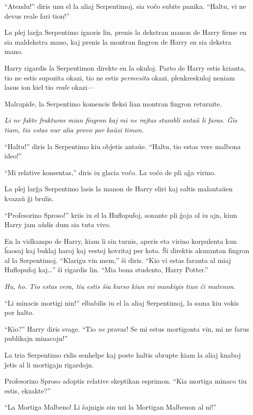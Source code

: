 ``Atendu!'' diris unu el la aliaj Serpentimoj, sia voĉo subite
panika. ``Haltu, vi ne devus reale fari tion!''

La plej larĝa Serpentimo ignoris lin, prenis la dekstran manon de Harry
firme en sia maldekstra mano, kaj prenis la montran fingron de Harry
en sia dekstra mano.

Harry rigardis la Serpentimon direkte en la okuloj. Parto de Harry
estis krianta, tio ne estis supozita okazi, tio ne estis \emph{permesita}
okazi, plenkreskuloj neniam lasus ion kiel tio \emph{reale} okazi—

Malrapide, la Serpentimo komencis fleksi lian montran fingron returnite.

\emph{Li ne fakte frakturos mian fingron kaj mi ne rajtas stumbli antaŭ
li faras. Ĝis tiam, tio estas nur alia provo por kaŭzi timon. }

``Haltu!'' diris la Serpentimo kiu obĵetis antaŭe. ``Haltu, tio estas
vere malbona ideo!''

``Mi relative konsentas,'' diris iu glacia voĉo. La voĉo de pli aĝa virino.

La plej larĝa Serpentimo lasis la manon de Harry eliri kaj saltis
malantaŭen kvazaŭ ĝi brulis.

``Profesorino Sproso!'' kriis iu el la Huflopufoj, sonante pli ĝoja
ol iu ajn, kiun Harry jam aŭdis dum sia tuta vivo.

En la vidkampo de Harry, kiam li sin turnis, aperis eta virino korpulenta kun
ĥaosaj kaj buklaj haroj kaj vestoj kovritaj per koto. Ŝi direktis akuzantan
fingron al la Serpentimoj. ``Klarigu vin mem,'' ŝi diris. ``Kio vi estas faranta
al miaj Huflopufoj kaj\ldots'' ŝi rigardis lin. ``Mia bona studento, Harry
Potter.''

\emph{Hu, ho. Tio estas vera, tiu estis ŝia kurso kiun mi mankigis tiun ĉi matenon.}

``Li minacis mortigi nin!'' elbabilis iu el la aliaj Serpentimoj, la
sama kiu vokis por halto.

``Kio?'' Harry diris svage. ``Tio \emph{ne} pravas! Se mi estus
mortigonta vin, mi ne farus publikajn minacojn!''

La tria Serpentimo ridis senhelpe kaj poste haltis abrupte kiam la
aliaj knaboj ĵetis al li mortigajn rigardojn.

Profesorino Sproso adoptis relative skeptikan esprimon. ``Kia mortiga
minaco tiu estis, ekzakte?''

``La Mortiga Malbeno! Li ŝajnigis sin uzi la Mortigan Malbenon al
ni!''

